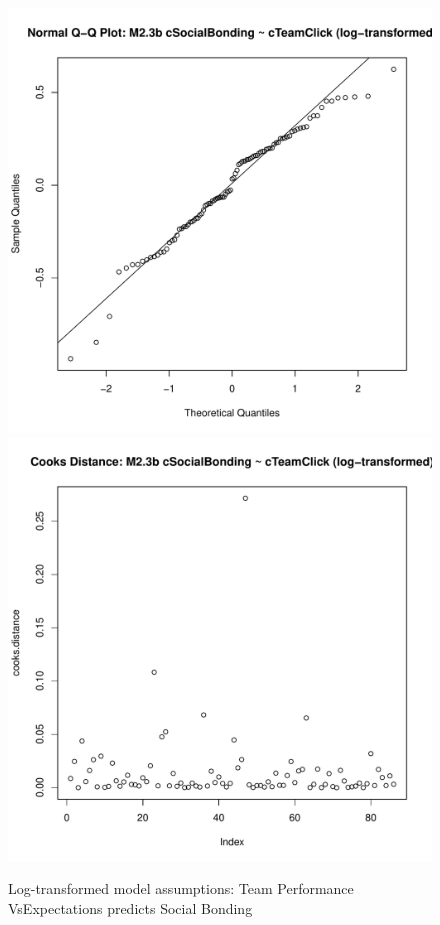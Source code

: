 {\begin{figure}[htbp]
        \includegraphics[scale =.4]{images/MLM23bLogQQNorm.pdf}
        \includegraphics[scale =.4]{images/MLM23bLogCooksD.pdf}
        \caption{Log-transformed model assumptions: Team Performance VsExpectations predicts Social Bonding}
        \label{fig:MLM3bLogAssumptions}
      \end{figure}




}
